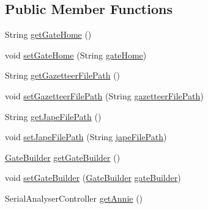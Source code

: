 \subsection*{Public Member Functions}
\begin{DoxyCompactItemize}
\item 
String \hyperlink{classcom_1_1poly_1_1nlp_1_1filekommander_1_1_file_kommander_ad8f9cf866506553d345ec9abc8bd2d87}{get\-Gate\-Home} ()
\item 
void \hyperlink{classcom_1_1poly_1_1nlp_1_1filekommander_1_1_file_kommander_a8481d268cb1ff04d24fd11e361ce0519}{set\-Gate\-Home} (String \hyperlink{classcom_1_1poly_1_1nlp_1_1filekommander_1_1_file_kommander_a4bdc4a5222eda1d37838da216256504e}{gate\-Home})
\item 
String \hyperlink{classcom_1_1poly_1_1nlp_1_1filekommander_1_1_file_kommander_a3ae2974328caa23267d68954fa14c817}{get\-Gazetteer\-File\-Path} ()
\item 
void \hyperlink{classcom_1_1poly_1_1nlp_1_1filekommander_1_1_file_kommander_a1a5a67f1f2fd6c50682861ae3a2c445c}{set\-Gazetteer\-File\-Path} (String \hyperlink{classcom_1_1poly_1_1nlp_1_1filekommander_1_1_file_kommander_addc44216b38536fd6b1ade38a6c2abdc}{gazetteer\-File\-Path})
\item 
String \hyperlink{classcom_1_1poly_1_1nlp_1_1filekommander_1_1_file_kommander_afab05cfab65d8962a2aac31e739a5fb0}{get\-Jape\-File\-Path} ()
\item 
void \hyperlink{classcom_1_1poly_1_1nlp_1_1filekommander_1_1_file_kommander_a84ad78f1592cfb94ab5199aa4f7fa29b}{set\-Jape\-File\-Path} (String \hyperlink{classcom_1_1poly_1_1nlp_1_1filekommander_1_1_file_kommander_a2304e5f2732e0911893782dee866ee6d}{jape\-File\-Path})
\item 
\hyperlink{classcom_1_1poly_1_1nlp_1_1filekommander_1_1gate_1_1_gate_builder}{Gate\-Builder} \hyperlink{classcom_1_1poly_1_1nlp_1_1filekommander_1_1_file_kommander_a563b4c00019c0e56ffe7b1b081e3dc46}{get\-Gate\-Builder} ()
\item 
void \hyperlink{classcom_1_1poly_1_1nlp_1_1filekommander_1_1_file_kommander_a88ea9f175d806bf7ef4a0ed5e2fe3649}{set\-Gate\-Builder} (\hyperlink{classcom_1_1poly_1_1nlp_1_1filekommander_1_1gate_1_1_gate_builder}{Gate\-Builder} \hyperlink{classcom_1_1poly_1_1nlp_1_1filekommander_1_1_file_kommander_a49132471a5825278776bfb4a84d8caa0}{gate\-Builder})
\item 
Serial\-Analyser\-Controller \hyperlink{classcom_1_1poly_1_1nlp_1_1filekommander_1_1_file_kommander_af3c32d49ecdde2b9ee91820a312005a0}{get\-Annie} ()

\end{DoxyCompactItemize}
